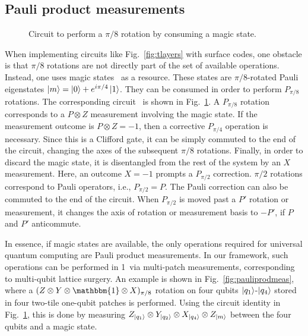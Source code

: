 \documentclass[prx,aps,letterpaper,twocolumn,allowfontchageintitle=true,accepted=2019-02-01]{quantumarticle}
\begin{document}
\subsection{Pauli product measurements}

\begin{figure}[b!]
\centering
\def\svgwidth{0.93\linewidth}

\caption{Circuit to perform a $\pi/8$ rotation by consuming a magic state.}
\label{fig:magicstateuse}
\end{figure}

When implementing circuits like Fig.~\ref{fig:tlayers} with surface codes, one obstacle is that $\pi/8$ rotations are not directly part of the set of available operations. Instead, one uses magic states~\cite{Bravyi2005} as a resource. These states are $\pi/8$-rotated Pauli eigenstates $\ket{m} = \ket{0} + e^{i\pi/4}\ket{1}$. They can be consumed in order to perform $P_{\pi/8}$ rotations. The corresponding circuit~\cite{Litinski2018} is shown in Fig.~\ref{fig:magicstateuse}. A $P_{\pi/8}$ rotation corresponds to a $P \otimes Z$ measurement involving the magic state. If the measurement outcome is $P \otimes Z = -1$, then a corrective $P_{\pi/4}$ operation is necessary. Since this is a Clifford gate, it can be simply commuted to the end of the circuit, changing the axes of the subsequent $\pi/8$ rotations. Finally, in order to discard the magic state, it is disentangled from the rest of the system by an $X$ measurement. Here, an outcome $X=-1$ prompts a $P_{\pi/2}$ correction. $\pi/2$ rotations correspond to Pauli operators, i.e., $P_{\pi/2} = P$. The Pauli correction can also be commuted to the end of the circuit. When $P_{\pi/2}$ is moved past a $P'$ rotation or measurement, it changes the axis of rotation or measurement basis to $-P'$, if $P$ and $P'$ anticommute.

In essence, if magic states are available, the only operations required for universal quantum computing are Pauli product measurements. In our framework, such operations can be performed in 1\clock \ via multi-patch measurements, corresponding to multi-qubit lattice surgery. An example is shown in Fig.~\ref{fig:pauliprodmeas}, where a $(Z\otimes Y \otimes \mathbbm{1} \otimes X)_{\pi/8}$ rotation on four qubits $\ket{q_1}$-$\ket{q_4}$ stored in four two-tile one-qubit patches is performed. Using the circuit identity in Fig.~\ref{fig:magicstateuse}, this is done by measuring $Z_{\ket{q_1}}\otimes Y_{\ket{q_2}} \otimes X_{\ket{q_4}} \otimes Z_{\ket{m}}$ between the four qubits and a magic state. 
\end{document}
